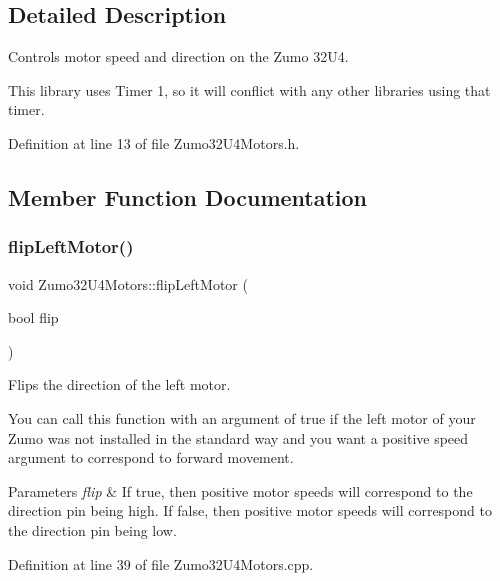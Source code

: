 \subsection{Detailed Description}
Controls motor speed and direction on the Zumo 32\+U4. 

This library uses Timer 1, so it will conflict with any other libraries using that timer. 

Definition at line 13 of file Zumo32\+U4\+Motors.\+h.



\subsection{Member Function Documentation}
\mbox{\label{class_zumo32_u4_motors_a18cbe58293cdc075528414861d614931}} 
\subsubsection{\texorpdfstring{flip\+Left\+Motor()}{flipLeftMotor()}}
{\footnotesize\ttfamily void Zumo32\+U4\+Motors\+::flip\+Left\+Motor (\begin{DoxyParamCaption}\item[{bool}]{flip }\end{DoxyParamCaption})\hspace{0.3cm}{\ttfamily [static]}}



Flips the direction of the left motor. 

You can call this function with an argument of {\ttfamily true} if the left motor of your Zumo was not installed in the standard way and you want a positive speed argument to correspond to forward movement.


\begin{DoxyParams}{Parameters}
{\em flip} & If true, then positive motor speeds will correspond to the direction pin being high. If false, then positive motor speeds will correspond to the direction pin being low. \\
\hline
\end{DoxyParams}


Definition at line 39 of file Zumo32\+U4\+Motors.\+cpp.

\mbox{\label{class_zumo32_u4_motors_a4e37f55575f2e468d50de17c369ad54d}} 
